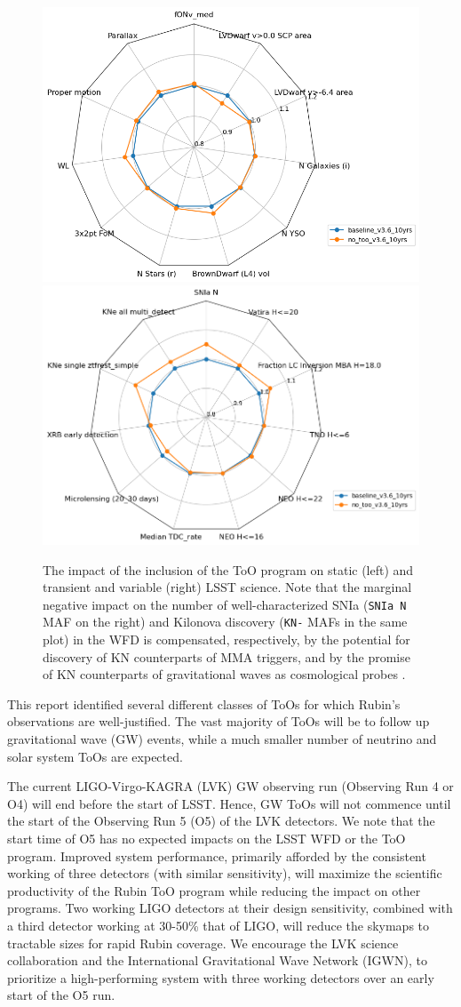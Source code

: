 \begin{figure}
    \centering
    \includegraphics[width=0.5\linewidth]{figures/baseline_v36_wfd_static.png}\includegraphics[width=0.5\linewidth]{figures/baseline_v36_wfd_transient.png}
    \caption{The impact of the inclusion of the ToO program on static (left) and transient and variable (right) LSST science. Note that the marginal negative impact on the number of well-characterized SNIa (\texttt{SNIa N} MAF on the right) and Kilonova discovery (\texttt{KN-} MAFs in the same plot) in the WFD is compensated, respectively, by the potential for discovery of KN counterparts of MMA triggers, and by the promise of KN counterparts of gravitational waves as cosmological probes \citep[\eg ,][]{PhysRevResearch.2.022006, gianfagna2024potential}.}
    \label{fig:too}
\end{figure}
This report identified several different classes of ToOs for which Rubin's observations are well-justified. The vast majority of ToOs will be to follow up gravitational wave (GW) events, while a much smaller number of neutrino and solar system ToOs are expected. 

The current LIGO-Virgo-KAGRA (LVK) GW observing run (Observing Run 4 or O4) will end before the start of LSST. Hence, GW ToOs will not commence until the start of the Observing Run 5 (O5) of the LVK detectors. We note that the start time of O5 has no expected impacts on the LSST WFD or the ToO program. Improved system performance, primarily afforded by the consistent working of three detectors (with similar sensitivity), will maximize the scientific productivity of the Rubin ToO program while reducing the impact on other programs. Two working LIGO detectors at their design sensitivity, combined with a third detector working at 30-50\% that of LIGO, will reduce the skymaps to tractable sizes for rapid Rubin coverage. We encourage the LVK science collaboration and the International Gravitational Wave Network (IGWN), to prioritize a high-performing system with three working detectors over an early start of the O5 run. 


